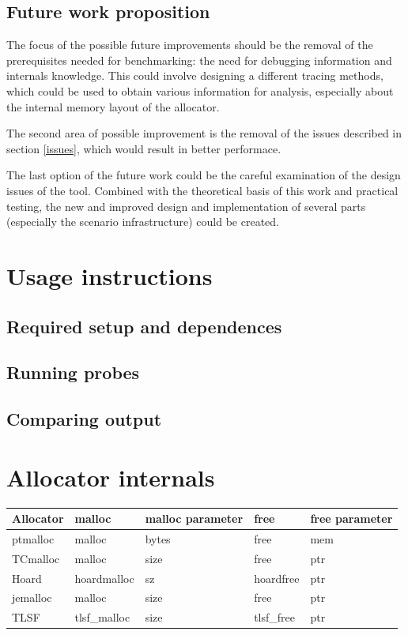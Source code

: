\section{Future work proposition}

The focus of the possible future improvements should be the removal of the prerequisites needed for benchmarking: the need for debugging information and internals knowledge. This could involve designing a different tracing methods, which could be used to obtain various information for analysis, especially about the internal memory layout of the allocator.

The second area of possible improvement is the removal of the issues described in section \ref{issues}, which would result in better performace.

The last option of the future work could be the careful examination of the design issues of the tool. Combined with the theoretical basis of this work and practical testing, the new and improved design and implementation of several parts (especially the scenario infrastructure) could be created.

\appendix
\chapter{Usage instructions}

\section{Required setup and dependences}

\section{Running probes}

\section{Comparing output}

\chapter{Allocator internals}
\begin{tabular}{|l|l|l|l|l|}
\hline
Allocator & malloc & malloc parameter & free & free parameter \\ \hline \hline
ptmalloc  & malloc & bytes & free & mem \\ \hline
 TCmalloc  & malloc & size  & free & ptr \\ \hline
Hoard     & hoardmalloc & sz & hoardfree & ptr \\ \hline
jemalloc  & malloc & size & free & ptr \\ \hline
TLSF      & tlsf\_malloc & size & tlsf\_free & ptr \\ \hline
\end{tabular}
